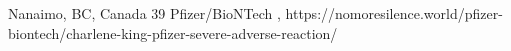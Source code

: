           {Nanaimo, BC, Canada}
          {39}
          {Pfizer/BioNTech}
          {}
          {
            ,
          }
          {https://nomoresilence.world/pfizer-biontech/charlene-king-pfizer-severe-adverse-reaction/}
